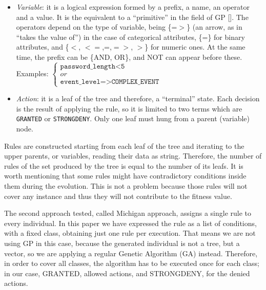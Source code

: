 \begin{itemize}
\item {\em Variable}: it is a logical expression formed by a prefix, a
  name, an operator and a value. It is the equivalent to a
  ``primitive'' in the field of GP [\cite{back1996evolutionary}]. The
  operators depend on the type of variable, being \{=$>$\} (an arrow, as in ``takes the value of'') in the
  case of categorical attributes, \{=\} for binary attributes, and \{$<$, $<=$,=,$=>$,
  $>$\} for numeric ones. At the same time, the prefix can be \{AND,
  OR\}, and NOT can appear before these. \\ %
    Examples:
   \begin{math}
     \left \{
   \begin{array}{l}
     \texttt{password\_length<5} \\
     or \\
      \texttt{event\_level=>COMPLEX\_EVENT}
   \end{array}
   \right .
   \end{math}
\item {\em Action}: it is a leaf of the tree and therefore, a ``terminal'' state. Each decision is the result of applying the rule, so it is limited to two terms which are \texttt{GRANTED} or \texttt{STRONGDENY}. Only one leaf must hung from a parent (variable) node.
\end{itemize}

Rules are constructed starting from each leaf of the tree and iterating to the upper parents, or variables, reading their data as string. Therefore, the number of rules of the set produced by the tree is equal to the number of its leafs. It is worth mentioning that some rules might have contradictory conditions inside them during the evolution. This is not a problem because those rules will not cover any instance and thus they will not contribute to the fitness value. 

The second approach tested, called Michigan approach, assigns a single
rule to every individual. In this paper we have expressed the rule as
a list of conditions, with a fixed class, obtaining just one rule per
execution. That means we are not using GP in this case, because the
generated individual is not a tree, but a vector, so we are applying a
regular Genetic Algorithm (GA) instead. Therefore, in order to cover
all classes, the algorithm has to be executed once for each class; in
our case, GRANTED, allowed actions, and STRONGDENY, for the denied
actions. 

